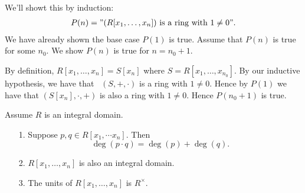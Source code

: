 \documentclass[12pt,letterpaper]{algebra_book}
\theoremstyle{definition}
\begin{document}
\begin{prf}
    We'll showt this by induction:
    \begin{align*}
        P(n) = "(R[x_1, \dots, x_n]) \text{ is a ring with } 1 \ne 0".
    \end{align*}
    We have already shown the base case $P(1)$ is true. Assume
    that $P(n)$ is true for some $n_0$. We show $P(n)$ is true for
    $n = n_0 + 1$.

    By definition, $R[x_1, \dots, x_n] = S[x_n]$ where $S = R[x_1,
    \dots, x_{n_0}]$. By our inductive hypothesis, we have that
    \ $(S, +, \cdot )$ is a ring with $1 \ne 0$. Hence by $P(1)$
    we have that $(S[x_n], \cdot, +)$ is also a ring with $1 \ne
    0$. Hence $P(n_0 +  1)$ is true.
\end{prf}

\begin{proposition}
    Assume $R$ is an integral domain. 
    \begin{itemize}
        \item[1.] Suppose $p, q \in R[x_1, \cdots x_n]$. Then 
        \[
            \deg(p \cdot q) = \deg(p) + \deg(q).   
        \] 
        \item[2.] $R[x_1, \dots, x_n]$ is also an integral
        domain. 

        \item[3.] The units of $R[x_1, \dots, x_n]$ is
        $R^{\times}$.  
    \end{itemize}
\end{proposition}
\end{document}
